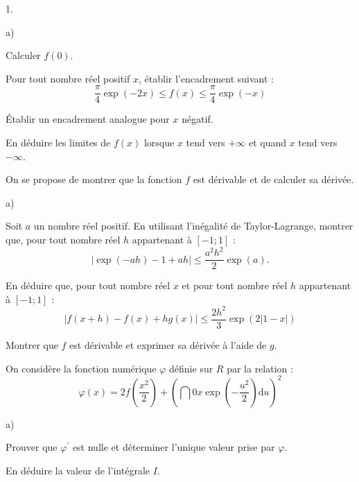 \documentclass[11pt]{article}%
\begin{document}
\begin{noliste}{1.}
 \setlength{\itemsep}{4mm}
\item 

\begin{noliste}{a)}
 \setlength{\itemsep}{2mm}
\item Calculer $f(0)$.

\item Pour tout nombre réel positif $x$, établir l'encadrement suivant
: 
\[
\dfrac{\pi }{4}\exp (-2x)\leq f(x)\leq \dfrac{\pi }{4}\exp (-x)
\]

\item Établir un encadrement analogue pour $x$ négatif.

\item En déduire les limites de $f(x)$ lorsque $x$ tend vers $ + \infty
$ et
quand $x$ tend vers $-\infty $.
\end{noliste}

\item On se propose de montrer que la fonction $f$ est dérivable et de
calculer sa dérivée.

\begin{noliste}{a)}
 \setlength{\itemsep}{2mm}
\item Soit $a$ un nombre réel positif. En utilisant l'inégalité de
Taylor-Lagrange, montrer que, pour tout nombre réel $h$ appartenant à
$[-1;1] $ : 
\[
\left| \exp (-ah)-1 + ah\right| \leq \dfrac{a^{2}h^{2}}{2}\exp
(a).
\]

\item En déduire que, pour tout nombre réel $x$ et pour tout nombre
réel $h$
appartenant à $[-1;1]$ : 
\[
\left| f(x + h)-f(x) + hg(x)\right| \leq \dfrac{2h^{2}}{3}\exp
\left( 2|1-x|\right)
\]

\item Montrer que $f$ est dérivable et exprimer sa dérivée à l'aide de
$g$.
\end{noliste}

\item On considère la fonction numérique $\varphi $ définie sur $R$ par
la
relation : 
\[
\varphi (x) = 2f\left( \dfrac{x^{2}}{2}\right) + \left( \dint{0}{x}\exp
\left( -\dfrac{u^{2}}{2}\right) \text{d}u\right) ^{2}
\]

\begin{noliste}{a)}
 \setlength{\itemsep}{2mm}
\item Prouver que $\varphi ^{\prime }$ est nulle et déterminer l'unique
valeur prise par $\varphi $.

\item En déduire la valeur de l'intégrale $I$.
\end{noliste}
\end{noliste}
\end{document}

